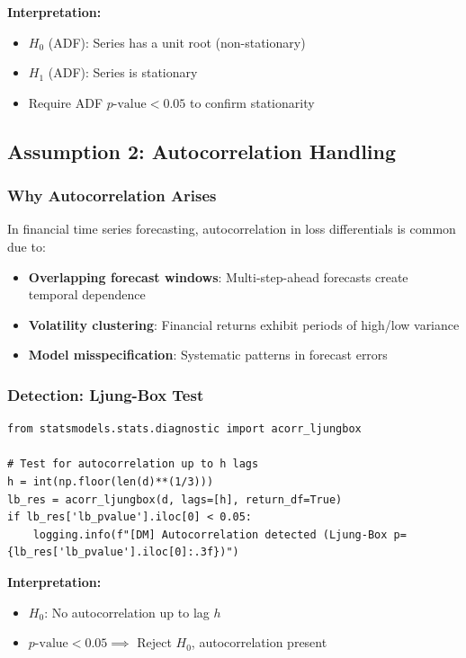 \documentclass[11pt,a4paper]{article}
\begin{document}
\textbf{Interpretation:}
\begin{itemize}
    \item $H_0$ (ADF): Series has a unit root (non-stationary)
    \item $H_1$ (ADF): Series is stationary
    \item Require ADF $p\text{-value} < 0.05$ to confirm stationarity
\end{itemize}

\subsection{Assumption 2: Autocorrelation Handling}

\subsubsection*{Why Autocorrelation Arises}

In financial time series forecasting, autocorrelation in loss differentials is common due to:

\begin{itemize}
    \item \textbf{Overlapping forecast windows}: Multi-step-ahead forecasts create temporal dependence
    \item \textbf{Volatility clustering}: Financial returns exhibit periods of high/low variance
    \item \textbf{Model misspecification}: Systematic patterns in forecast errors
\end{itemize}

\subsubsection*{Detection: Ljung-Box Test}

\begin{lstlisting}[caption={Ljung-Box Autocorrelation Test}]
from statsmodels.stats.diagnostic import acorr_ljungbox

# Test for autocorrelation up to h lags
h = int(np.floor(len(d)**(1/3)))
lb_res = acorr_ljungbox(d, lags=[h], return_df=True)
if lb_res['lb_pvalue'].iloc[0] < 0.05:
    logging.info(f"[DM] Autocorrelation detected (Ljung-Box p={lb_res['lb_pvalue'].iloc[0]:.3f})")
\end{lstlisting}

\textbf{Interpretation:}
\begin{itemize}
    \item $H_0$: No autocorrelation up to lag $h$
    \item $p\text{-value} < 0.05 \implies$ Reject $H_0$, autocorrelation present
\end{itemize}
\end{document}
